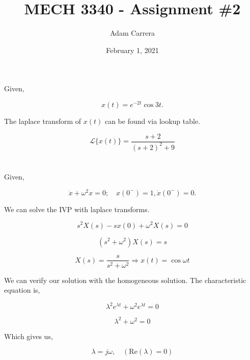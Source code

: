 \documentclass[12pt]{article}
\author{Adam Carrera}
\date{February 1, 2021}
\title{MECH 3340 - Assignment \#2}
\numberwithin{equation}{section}
\newcommand{\RE}{\mathrm{Re}}
\begin{document}
  \maketitle

  \section{}

  Given,

  \[
      x(t) = e^{-2t}\cos3t
    .\]

  The laplace transform of $ x(t) $ can be found via lookup table.

  \begin{equation}
    \mathcal{L}\{x(t)\} = \frac{s + 2}{(s + 2)^2 + 9}
  \end{equation}

  \section{}

  Given,

  \[
      \ddot x + \omega ^2 x = 0; \quad x(0^-) = 1, \dot x(0^-) = 0
    .\]

  We can solve the IVP with laplace transforms.

  \begin{equation}
    s ^2 X(s) - sx(0) + \omega ^2 X(s) = 0
  \end{equation}

  \begin{equation}
    \left( s ^2 + \omega ^2 \right) X(s) = s
  \end{equation}

  \begin{equation}
    X(s) = \frac{s}{s ^2 + \omega ^2} \Rightarrow x(t) = \cos\omega t
  \end{equation}

  \newpage
  We can verify our solution with the homogeneous solution. The characteristic equation is,

  \begin{equation}
    \lambda ^2 e^{\lambda t} + \omega ^2 e^{\lambda t} = 0
  \end{equation}

  \begin{equation}
    \lambda ^2 + \omega ^2 = 0
  \end{equation}

  Which gives us,

  \begin{equation}
    \lambda = j\omega, \quad (\RE(\lambda) = 0)
  \end{equation}
\end{document}
